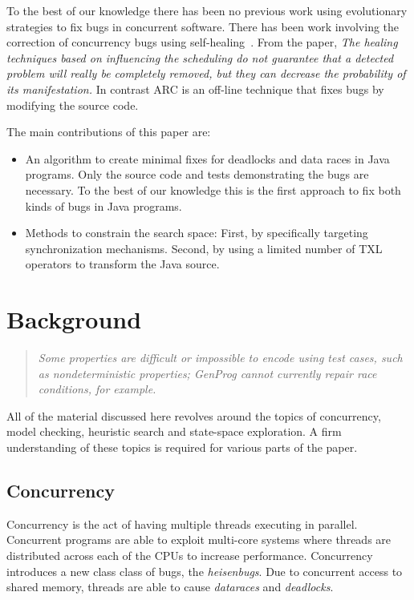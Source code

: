 \documentclass[10pt, conference, compsocconf]{IEEEtran}
\begin{document}
To the best of our knowledge there has been no previous work using evolutionary
strategies to fix bugs in concurrent software.  There has been work involving
the correction of concurrency bugs using self-healing~\cite{LVK08}. From the
paper, \textit{The healing techniques based on influencing the scheduling do
not guarantee that a detected problem will really be completely removed, but
they can decrease the probability of its manifestation.} In contrast ARC is an
off-line technique that fixes bugs by modifying the source code.

The main contributions of this paper are:

\begin{itemize}

\item An algorithm to create minimal fixes for deadlocks and data races in Java
programs. Only the source code and tests demonstrating the bugs are necessary.
To the best of our knowledge this is the first approach to fix both kinds of
bugs in Java programs.

\item Methods to constrain the search space: First, by specifically targeting
synchronization mechanisms. Second, by using a limited number of TXL operators
to transform the Java source.

\end{itemize}

\section{Background}
\label{sec:background}

\begin{quote}\textit{Some properties are difficult or impossible to encode
using test cases, such as nondeterministic properties; GenProg cannot
currently repair race conditions, for example.}~\cite{GNFW11}
\end{quote}

All of the material discussed here revolves around the topics of concurrency,
model checking, heuristic search and state-space exploration. A firm
understanding of these topics is required for various parts of the paper.

\subsection{Concurrency}
\label{sec:concurrency}

Concurrency is the act of having multiple threads executing in parallel.
Concurrent programs are able to exploit multi-core systems where threads are distributed across each of the CPUs to increase performance. Concurrency
introduces a new class class of bugs, the \textit{heisenbugs}.  Due to
concurrent access to shared memory, threads are able to cause
\textit{dataraces} and \textit{deadlocks}.
\end{document}
